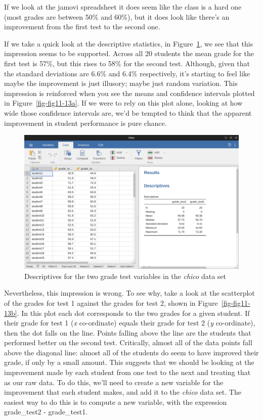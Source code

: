 \documentclass[
  a4paper,
]{book}
\begin{document}
If we look at the jamovi spreadsheet it does seem like the class is a
hard one (most grades are between 50\% and 60\%), but it does look like
there's an improvement from the first test to the second one.

If we take a quick look at the descriptive statistics, in
Figure~\ref{fig-fig11-12}, we see that this impression seems to be
supported. Across all 20 students the mean grade for the first test is
57\%, but this rises to 58\% for the second test. Although, given that
the standard deviations are 6.6\% and 6.4\% respectively, it's starting
to feel like maybe the improvement is just illusory; maybe just random
variation. This impression is reinforced when you see the means and
confidence intervals plotted in Figure~\ref{fig-fig11-13a}. If we were
to rely on this plot alone, looking at how wide those confidence
intervals are, we'd be tempted to think that the apparent improvement in
student performance is pure chance.

\begin{figure}

\includegraphics[width=1\textwidth,height=\textheight]{images/fig11-12.png} \hfill{}

\caption{\label{fig-fig11-12}Descriptives for the two grade test
variables in the \emph{chico} data set}

\end{figure}

Nevertheless, this impression is wrong. To see why, take a look at the
scatterplot of the grades for test 1 against the grades for test 2,
shown in Figure~\ref{fig-fig11-13b}. In this plot each dot corresponds
to the two grades for a given student. If their grade for test 1
(\emph{x} co-ordinate) equals their grade for test 2 (\emph{y}
co-ordinate), then the dot falls on the line. Points falling above the
line are the students that performed better on the second test.
Critically, almost all of the data points fall above the diagonal line:
almost all of the students do seem to have improved their grade, if only
by a small amount. This suggests that we should be looking at the
improvement made by each student from one test to the next and treating
that as our raw data. To do this, we'll need to create a new variable
for the improvement that each student makes, and add it to the
\emph{chico} data set. The easiest way to do this is to compute a new
variable, with the expression grade\_test2 - grade\_test1.
\end{document}
